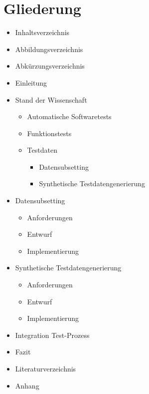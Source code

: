 \section{Gliederung}

\begin{itemize}
\item Inhaltsverzeichnis
\item Abbildungsverzeichnis
\item Abkürzungsverzeichnis
\item Einleitung
\item Stand der Wissenschaft
    \begin{itemize}
    \item Automatische Softwaretests
    \item Funktionstests
    \item Testdaten
        \begin{itemize}
        \item Datensubsetting
        \item Synthetische Testdatengenerierung
        \end{itemize}
    \end{itemize}
\item Datensubsetting
    \begin{itemize}
    \item Anforderungen
    \item Entwurf
    \item Implementierung
    \end{itemize}
\item Synthetische Testdatengenerierung
    \begin{itemize}
    \item Anforderungen
    \item Entwurf
    \item Implementierung
    \end{itemize}
\item Integration Test-Prozess
\item Fazit
\item Literaturverzeichnis
\item Anhang
\end{itemize}

